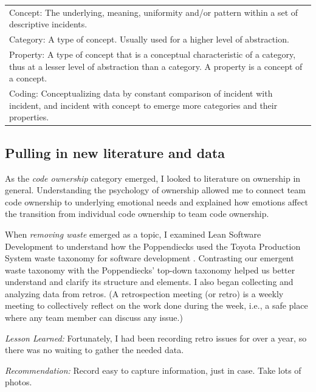 \begin{table}[t]
\renewcommand{\arraystretch}{1.5}
\centering
{}
\label{glaserDefinitions}
\begin{tabular}{|l|}
\hline
Concept: The underlying, meaning, uniformity and/or pattern within a set of descriptive incidents. \\ 
Category: A type of concept. Usually used for a higher level of abstraction. \\
Property: A type of concept that is a conceptual characteristic of a category, thus at a lesser level of abstraction than a category. A property is a concept of a concept. \\ 
Coding: Conceptualizing data by constant comparison of incident with incident, and incident with concept to emerge more categories and their properties.
\\ \hline
\end{tabular}
\end{table}

\subsection{Pulling in new literature and data}
As the \textit{code ownership} category emerged, I looked to literature on ownership in general. Understanding the psychology of ownership \cite{Pierce2001} allowed me to connect team code ownership to underlying emotional needs and explained how emotions affect the transition from individual code ownership to team code ownership.

When \textit{removing waste} emerged as a topic, I examined Lean Software Development to understand how the Poppendiecks used the Toyota Production System waste taxonomy for software development \cite{PoppendieckConceptToCash}. Contrasting our emergent waste taxonomy with the Poppendiecks' top-down taxonomy helped us better understand and clarify its structure and elements. I also began collecting and analyzing data from retros. (A retrospection meeting (or retro) is a weekly meeting to collectively reflect on the work done during the week, i.e., a safe place where any team member can discuss any issue.) 

\textit{Lesson Learned:} Fortunately, I had been recording retro issues for over a year, so there was no waiting to gather the needed data. 

\textit{Recommendation:} Record easy to capture information, just in case. Take lots of photos.
